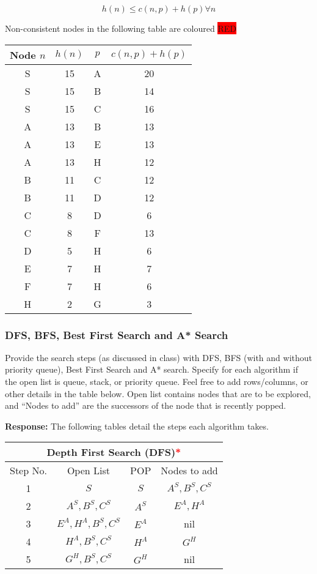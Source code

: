 \documentclass[12pt, letterpaper]{article}
\newcommand{\mybox}[1]{\par\noindent\colorbox{shadecolor}
{\parbox{\dimexpr\textwidth-2\fboxsep\relax}{#1}}}
\begin{document}
\[h(n) \leq c(n,p) + h(p) \forall n\]

Non-consistent nodes in the following table are coloured \colorbox{red}{RED}

\begin{center}
    \begin{tabular}{|c|c|c|c|} 
    \hline
    Node $n$ & $h(n)$ & $p$ & $c(n,p)+h(p)$ \tabularnewline
    \hline
    S & 15 & A & 20\tabularnewline
    \hline
    \rowcolor{red}S & 15 & B & 14\tabularnewline
    \hline
    S & 15 & C & 16\tabularnewline
    \hline
    A & 13 & B & 13\tabularnewline
    \hline
    A & 13 & E & 13\tabularnewline
    \hline
    \rowcolor{red}A & 13 & H & 12\tabularnewline
    \hline
    B & 11 & C & 12\tabularnewline
    \hline
    B & 11 & D & 12\tabularnewline
    \hline
    \rowcolor{red}C & 8 & D & 6\tabularnewline
    \hline
    C & 8 & F & 13\tabularnewline
    \hline
    D & 5 & H & 6\tabularnewline
    \hline
    E & 7 & H & 7\tabularnewline
    \hline
    \rowcolor{red}F & 7 & H & 6\tabularnewline
    \hline
    H & 2 & G & 3\tabularnewline
    \hline

    \end{tabular}
\end{center}

\subsubsection{DFS, BFS, Best First Search and A* Search}
\mybox{Provide the search steps (as discussed in class) with DFS, BFS (with and without priority
queue), Best First Search and A* search. Specify for each algorithm if the open list is
queue, stack, or priority queue. Feel free to add rows/columns, or other details in the
table below. Open list contains nodes that are to be explored, and “Nodes to add” are
the successors of the node that is recently popped.}

\textbf{Response:} The following tables detail the steps each algorithm takes.

\begin{center}
    \begin{tabular}{|c|c|c|c|}
    \hline
    \multicolumn{4}{|c|}{Depth First Search (\textbf{DFS})\textcolor{red}{*}}\\
    \hline
    Step No. & Open List & POP & Nodes to add \\ 
    \hline
    1 & $S$ & $S$ & $A^S, B^S, C^S$ \\
    \hline
    2 & $A^S, B^S, C^S$ & $A^S$ & $E^A,H^A$ \\
    \hline
    3 & $E^A, H^A, B^S, C^S$ & $E^A$ & nil \\
    \hline
    4 & $H^A, B^S, C^S$ & $H^A$ & $G^H$ \\
    \hline
    5 & $G^H,B^S,C^S$ & $G^H$ & nil \\
    \hline
    \end{tabular}
\end{center}
\end{document}
